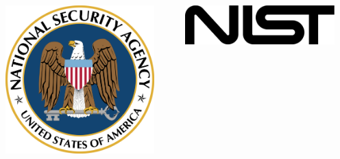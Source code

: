 \begin{frame}
  \begin{columns}
    \begin{column}{0.48\textwidth}
      \begin{center}
        \includegraphics[width=0.9\textwidth]{static/img/nsa.png}
      \end{center}
    \end{column}
    \begin{column}{0.48\textwidth}
      \begin{center}
        \includegraphics[width=0.9\textwidth]{static/img/NIST.png}
      \end{center}
    \end{column}
  \end{columns}
\end{frame}